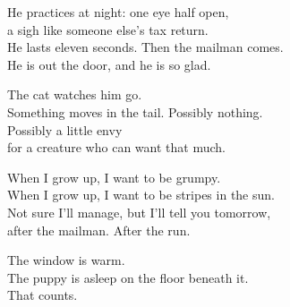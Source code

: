 \begin{lyrics}
He practices at night: one eye half open,\\
a sigh like someone else's tax return.\\
He lasts eleven seconds. Then the mailman comes.\\
He is out the door, and he is so glad.

The cat watches him go.\\
Something moves in the tail. Possibly nothing.\\
Possibly a little envy\\
for a creature who can want that much.

When I grow up, I want to be grumpy.\\
When I grow up, I want to be stripes in the sun.\\
Not sure I'll manage, but I'll tell you tomorrow,\\
after the mailman. After the run.

The window is warm.\\
The puppy is asleep on the floor beneath it.\\
That counts.
\end{lyrics}

